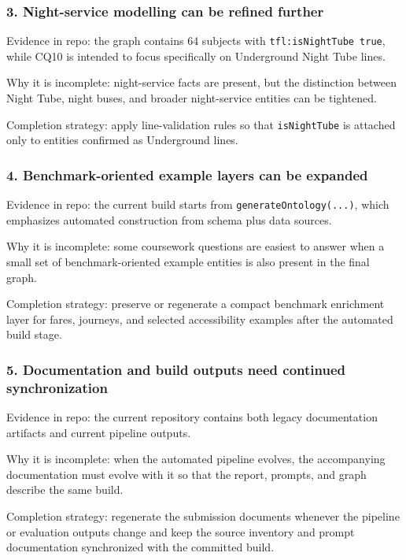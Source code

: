 \documentclass[
  11pt,
  a4paper,
]{article}
\begin{document}
\subsubsection{3. Night-service modelling can be refined
further}\label{3-night-service-modelling-can-be-refined-further}

Evidence in repo: the graph contains 64 subjects with
\texttt{tfl:isNightTube\ true}, while CQ10 is intended to focus
specifically on Underground Night Tube lines.

Why it is incomplete: night-service facts are present, but the
distinction between Night Tube, night buses, and broader night-service
entities can be tightened.

Completion strategy: apply line-validation rules so that
\texttt{isNightTube} is attached only to entities confirmed as
Underground lines.

\subsubsection{4. Benchmark-oriented example layers can be
expanded}\label{4-benchmark-oriented-example-layers-can-be-expanded}

Evidence in repo: the current build starts from
\texttt{generateOntology(...)}, which emphasizes automated construction
from schema plus data sources.

Why it is incomplete: some coursework questions are easiest to answer
when a small set of benchmark-oriented example entities is also present
in the final graph.

Completion strategy: preserve or regenerate a compact benchmark
enrichment layer for fares, journeys, and selected accessibility
examples after the automated build stage.

\subsubsection{5. Documentation and build outputs need continued
synchronization}\label{5-documentation-and-build-outputs-need-continued-synchronization}

Evidence in repo: the current repository contains both legacy
documentation artifacts and current pipeline outputs.

Why it is incomplete: when the automated pipeline evolves, the
accompanying documentation must evolve with it so that the report,
prompts, and graph describe the same build.

Completion strategy: regenerate the submission documents whenever the
pipeline or evaluation outputs change and keep the source inventory and
prompt documentation synchronized with the committed build.
\end{document}
